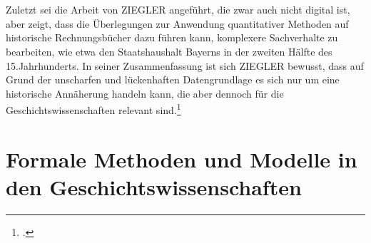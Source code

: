 \documentclass[12pt,a4paper]{article}
\begin{document}
\\
\\
Zuletzt sei die Arbeit von ZIEGLER angeführt, die zwar auch nicht digital ist, aber zeigt, dass die Überlegungen zur Anwendung quantitativer Methoden auf historische Rechnungsbücher dazu führen kann, komplexere Sachverhalte zu bearbeiten, wie etwa den Staatshaushalt Bayerns in der zweiten Hälfte des 15.Jahrhunderts. In seiner Zusammenfassung ist sich ZIEGLER bewusst, dass auf Grund der unscharfen und lückenhaften Datengrundlage es sich nur um eine historische Annäherung handeln kann, die aber dennoch für die Geschichtswissenschaften relevant sind.\footcite[][S.221-230]{ziegler1981Staatshaushalt}

\newpage
\section{Formale Methoden und Modelle in den Geschichtswissenschaften}
\end{document}
